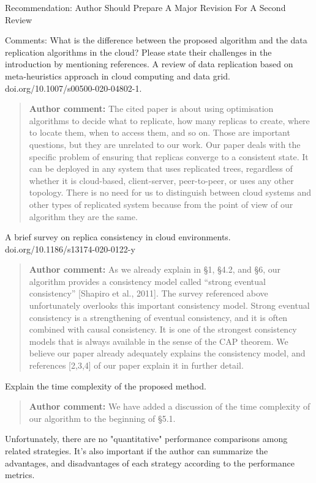 \documentclass[10pt]{article}
\newcommand{\authorcomment}[1]{\begin{quote}\textbf{Author comment:} #1\end{quote}}
\begin{document}
\begin{spverbatim}
Recommendation: Author Should Prepare A Major Revision For A Second Review

Comments:
What is the difference between the proposed algorithm and the data replication algorithms in the cloud? Please state their challenges in the introduction by mentioning references.
A review of data replication based on meta-heuristics approach in cloud computing and data grid. doi.org/10.1007/s00500-020-04802-1.
\end{spverbatim}
\authorcomment{The cited paper is about using optimisation algorithms to decide what to replicate, how many replicas to create, where to locate them, when to access them, and so on.
Those are important questions, but they are unrelated to our work.
Our paper deals with the specific problem of ensuring that replicas converge to a consistent state.
It can be deployed in any system that uses replicated trees, regardless of whether it is cloud-based, client-server, peer-to-peer, or uses any other topology.
There is no need for us to distinguish between cloud systems and other types of replicated system because from the point of view of our algorithm they are the same.}
\begin{spverbatim}
A brief survey on replica consistency in cloud environments. doi.org/10.1186/s13174-020-0122-y
\end{spverbatim}
\authorcomment{As we already explain in {\S}1, {\S}4.2, and {\S}6, our algorithm provides a consistency model called ``strong eventual consistency'' [Shapiro et al., 2011].
The survey referenced above unfortunately overlooks this important consistency model.
Strong eventual consistency is a strengthening of eventual consistency, and it is often combined with causal consistency.
It is one of the strongest consistency models that is always available in the sense of the CAP theorem.
We believe our paper already adequately explains the consistency model, and references [2,3,4] of our paper explain it in further detail.}
\begin{spverbatim}
Explain the time complexity of the proposed method.
\end{spverbatim}
\authorcomment{We have added a discussion of the time complexity of our algorithm to the beginning of {\S}5.1.}
\begin{spverbatim}
Unfortunately, there are no "quantitative" performance comparisons among related strategies. It’s also important if the author can summarize the advantages, and disadvantages of each strategy according to the performance metrics.
\end{spverbatim}
\end{document}
